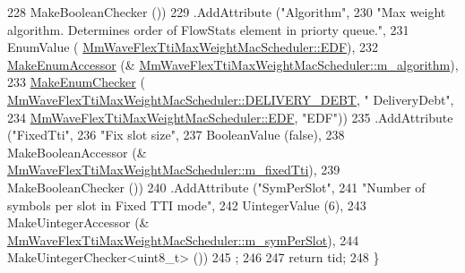 \begin{DoxyCode}
228                                                                         MakeBooleanChecker ())
229          .AddAttribute (\textcolor{stringliteral}{"Algorithm"},
230                                                                         \textcolor{stringliteral}{"Max weight algorithm. Determines
       order of FlowStats element in priorty queue."},
231                                                                         EnumValue (
      \hyperlink{classns3_1_1MmWaveFlexTtiMaxWeightMacScheduler_a1c15c536cd0b5b7c19533c208c7817a0ab4a151aa9f7d0ff09d04a82f2d403df7}{MmWaveFlexTtiMaxWeightMacScheduler::EDF}),
232                                                                         
      \hyperlink{namespacens3_af5050739867ce63896dec011e332c8ec}{MakeEnumAccessor} (&
      \hyperlink{classns3_1_1MmWaveFlexTtiMaxWeightMacScheduler_a334a408b37c8c7cb50203d357021ea21}{MmWaveFlexTtiMaxWeightMacScheduler::m\_algorithm}),
233                                                                         
      \hyperlink{namespacens3_a48832781a2b521d3d0091e05ece30615}{MakeEnumChecker} (
      \hyperlink{classns3_1_1MmWaveFlexTtiMaxWeightMacScheduler_a1c15c536cd0b5b7c19533c208c7817a0a993d6df6a90117138929d75c2648cd2a}{MmWaveFlexTtiMaxWeightMacScheduler::DELIVERY\_DEBT}, \textcolor{stringliteral}{"
      DeliveryDebt"},
234                                                                                                                                         
       \hyperlink{classns3_1_1MmWaveFlexTtiMaxWeightMacScheduler_a1c15c536cd0b5b7c19533c208c7817a0ab4a151aa9f7d0ff09d04a82f2d403df7}{MmWaveFlexTtiMaxWeightMacScheduler::EDF}, \textcolor{stringliteral}{"EDF"}))
235          .AddAttribute (\textcolor{stringliteral}{"FixedTti"},
236                                                                         \textcolor{stringliteral}{"Fix slot size"},
237                                                                         BooleanValue (\textcolor{keyword}{false}),
238                                                                         MakeBooleanAccessor (&
      \hyperlink{classns3_1_1MmWaveFlexTtiMaxWeightMacScheduler_a5642744f4685af9143c44bd8ed23077b}{MmWaveFlexTtiMaxWeightMacScheduler::m\_fixedTti}),
239                                                                         MakeBooleanChecker ())
240         .AddAttribute (\textcolor{stringliteral}{"SymPerSlot"},
241                                                                  \textcolor{stringliteral}{"Number of symbols per slot in Fixed TTI
       mode"},
242                                                                  UintegerValue (6),
243                                                                  MakeUintegerAccessor (&
      \hyperlink{classns3_1_1MmWaveFlexTtiMaxWeightMacScheduler_a1f72c01284b245a37f959230bf15e46b}{MmWaveFlexTtiMaxWeightMacScheduler::m\_symPerSlot}),
244                                                                  MakeUintegerChecker<uint8\_t> ())
245                 ;
246 
247         \textcolor{keywordflow}{return} tid;
248 \}
\end{DoxyCode}


